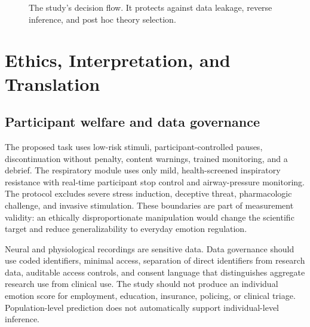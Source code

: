 \documentclass[conference]{IEEEtran}
\begin{document}
\begin{figure}[!t]
\centering
{}
\caption{The study's decision flow. It protects against data leakage, reverse inference, and post hoc theory selection.}\label{fig:inference-pipeline}
\end{figure}

\section{Ethics, Interpretation, and Translation}\label{sec:limits}

\subsection{Participant welfare and data governance}

The proposed task uses low-risk stimuli, participant-controlled pauses, discontinuation without penalty, content warnings, trained monitoring, and a debrief. The respiratory module uses only mild, health-screened inspiratory resistance with real-time participant stop control and airway-pressure monitoring. The protocol excludes severe stress induction, deceptive threat, pharmacologic challenge, and invasive stimulation. These boundaries are part of measurement validity: an ethically disproportionate manipulation would change the scientific target and reduce generalizability to everyday emotion regulation.

Neural and physiological recordings are sensitive data. Data governance should use coded identifiers, minimal access, separation of direct identifiers from research data, auditable access controls, and consent language that distinguishes aggregate research use from clinical use. The study should not produce an individual emotion score for employment, education, insurance, policing, or clinical triage. Population-level prediction does not automatically support individual-level inference.
\end{document}
